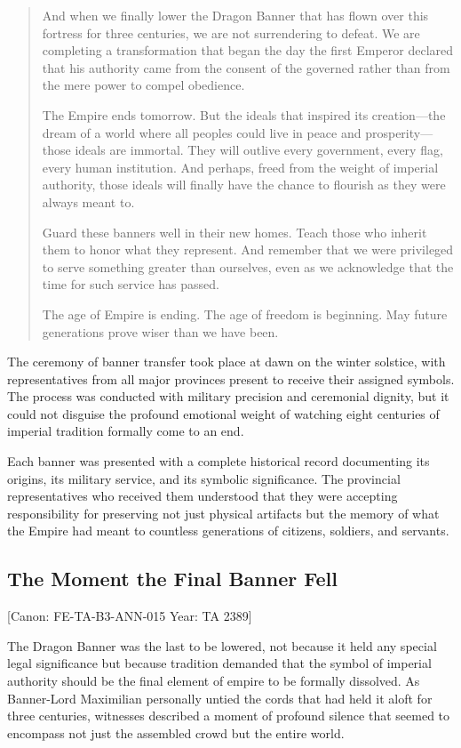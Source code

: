 \begin{quote}
And when we finally lower the Dragon Banner that has flown over this
fortress for three centuries, we are not surrendering to defeat. We are
completing a transformation that began the day the first Emperor
declared that his authority came from the consent of the governed rather
than from the mere power to compel obedience.

The Empire ends tomorrow. But the ideals that inspired its
creation---the dream of a world where all peoples could live in peace
and prosperity---those ideals are immortal. They will outlive every
government, every flag, every human institution. And perhaps, freed from
the weight of imperial authority, those ideals will finally have the
chance to flourish as they were always meant to.

Guard these banners well in their new homes. Teach those who inherit
them to honor what they represent. And remember that we were privileged
to serve something greater than ourselves, even as we acknowledge that
the time for such service has passed.

The age of Empire is ending. The age of freedom is beginning. May future
generations prove wiser than we have been.
\end{quote}

The ceremony of banner transfer took place at dawn on the winter
solstice, with representatives from all major provinces present to
receive their assigned symbols. The process was conducted with military
precision and ceremonial dignity, but it could not disguise the profound
emotional weight of watching eight centuries of imperial tradition
formally come to an end.

Each banner was presented with a complete historical record documenting
its origins, its military service, and its symbolic significance. The
provincial representatives who received them understood that they were
accepting responsibility for preserving not just physical artifacts but
the memory of what the Empire had meant to countless generations of
citizens, soldiers, and servants.

\subsection{The Moment the Final Banner
Fell}\label{the-moment-the-final-banner-fell}

{[}Canon: FE-TA-B3-ANN-015 \textbar{} Year: TA 2389{]}

The Dragon Banner was the last to be lowered, not because it held any
special legal significance but because tradition demanded that the
symbol of imperial authority should be the final element of empire to be
formally dissolved. As Banner-Lord Maximilian personally untied the
cords that had held it aloft for three centuries, witnesses described a
moment of profound silence that seemed to encompass not just the
assembled crowd but the entire world.

